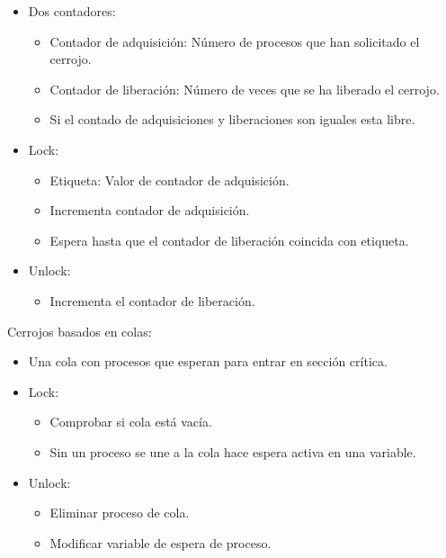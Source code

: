 \documentclass[12pt, twoside, openright]{report} %
\begin{document}
    \begin{itemize}
    
    \item
      Dos contadores:

      \begin{itemize}
      
      \item
        Contador de adquisición: Número de procesos que han solicitado
        el cerrojo.
      \item
        Contador de liberación: Número de veces que se ha liberado el
        cerrojo.
      \item
        Si el contado de adquisiciones y liberaciones son iguales esta
        libre.
      \end{itemize}
    \item
      Lock:

      \begin{itemize}
      
      \item
        Etiqueta: Valor de contador de adquisición.
      \item
        Incrementa contador de adquisición.
      \item
        Espera hasta que el contador de liberación coincida con
        etiqueta.
      \end{itemize}
    \item
      Unlock:

      \begin{itemize}
      
      \item
        Incrementa el contador de liberación.
      \end{itemize}
    \end{itemize}

    Cerrojos basados en colas:

    \begin{itemize}
    
    \item
      Una cola con procesos que esperan para entrar en sección
      crítica.
    \item
      Lock:

      \begin{itemize}
      
      \item
        Comprobar si cola está vacía.
      \item
        Sin un proceso se une a la cola hace espera activa en una
        variable.
      \end{itemize}
    \item
      Unlock:

      \begin{itemize}
      
      \item
        Eliminar proceso de cola.
      \item
        Modificar variable de espera de proceso.
      \end{itemize}
    \end{itemize}
\end{document}
